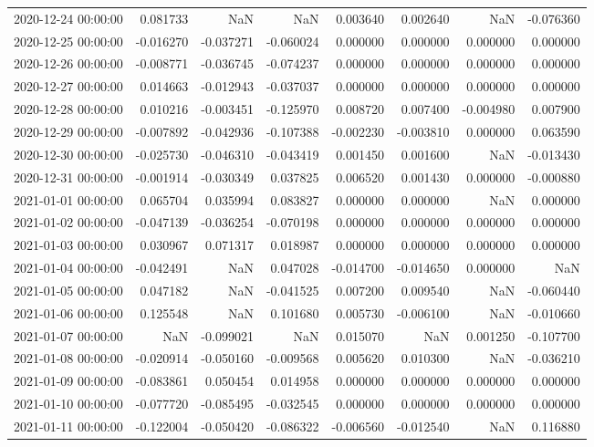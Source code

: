 \begin{tabular}{lrrrrrrr}
2020-12-24 00:00:00 & 0.081733 & NaN & NaN & 0.003640 & 0.002640 & NaN & -0.076360 \\
2020-12-25 00:00:00 & -0.016270 & -0.037271 & -0.060024 & 0.000000 & 0.000000 & 0.000000 & 0.000000 \\
2020-12-26 00:00:00 & -0.008771 & -0.036745 & -0.074237 & 0.000000 & 0.000000 & 0.000000 & 0.000000 \\
2020-12-27 00:00:00 & 0.014663 & -0.012943 & -0.037037 & 0.000000 & 0.000000 & 0.000000 & 0.000000 \\
2020-12-28 00:00:00 & 0.010216 & -0.003451 & -0.125970 & 0.008720 & 0.007400 & -0.004980 & 0.007900 \\
2020-12-29 00:00:00 & -0.007892 & -0.042936 & -0.107388 & -0.002230 & -0.003810 & 0.000000 & 0.063590 \\
2020-12-30 00:00:00 & -0.025730 & -0.046310 & -0.043419 & 0.001450 & 0.001600 & NaN & -0.013430 \\
2020-12-31 00:00:00 & -0.001914 & -0.030349 & 0.037825 & 0.006520 & 0.001430 & 0.000000 & -0.000880 \\
2021-01-01 00:00:00 & 0.065704 & 0.035994 & 0.083827 & 0.000000 & 0.000000 & NaN & 0.000000 \\
2021-01-02 00:00:00 & -0.047139 & -0.036254 & -0.070198 & 0.000000 & 0.000000 & 0.000000 & 0.000000 \\
2021-01-03 00:00:00 & 0.030967 & 0.071317 & 0.018987 & 0.000000 & 0.000000 & 0.000000 & 0.000000 \\
2021-01-04 00:00:00 & -0.042491 & NaN & 0.047028 & -0.014700 & -0.014650 & 0.000000 & NaN \\
2021-01-05 00:00:00 & 0.047182 & NaN & -0.041525 & 0.007200 & 0.009540 & NaN & -0.060440 \\
2021-01-06 00:00:00 & 0.125548 & NaN & 0.101680 & 0.005730 & -0.006100 & NaN & -0.010660 \\
2021-01-07 00:00:00 & NaN & -0.099021 & NaN & 0.015070 & NaN & 0.001250 & -0.107700 \\
2021-01-08 00:00:00 & -0.020914 & -0.050160 & -0.009568 & 0.005620 & 0.010300 & NaN & -0.036210 \\
2021-01-09 00:00:00 & -0.083861 & 0.050454 & 0.014958 & 0.000000 & 0.000000 & 0.000000 & 0.000000 \\
2021-01-10 00:00:00 & -0.077720 & -0.085495 & -0.032545 & 0.000000 & 0.000000 & 0.000000 & 0.000000 \\
2021-01-11 00:00:00 & -0.122004 & -0.050420 & -0.086322 & -0.006560 & -0.012540 & NaN & 0.116880 \\

\end{tabular}
